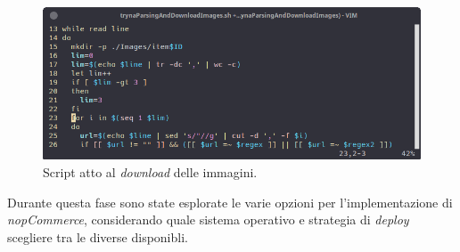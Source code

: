 \documentclass[a4paper]{report}
\begin{document}
		\begin{figure}[H]
			\includegraphics[width=\textwidth]{Script.png}
			\caption{Script atto al \emph{download} delle immagini.}\label{fig:script}
		\end{figure}

		Durante questa fase sono state esplorate le varie opzioni per l'implementazione di \emph{nopCommerce},
		considerando quale sistema operativo e strategia di \emph{deploy} scegliere tra le diverse disponibli.
\end{document}
